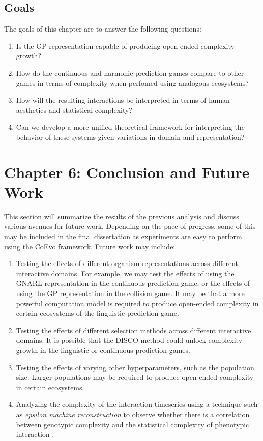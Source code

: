 \documentclass{article}
\begin{document}
\subsection*{Goals}
The goals of this chapter are to answer the following questions:
\begin{enumerate}
    \item Is the GP representation capable of producing open-ended complexity growth?
    \item How do the continuous and harmonic prediction games compare to other games in terms of 
        complexity when perfomed using analogous ecosystems?
    \item How will the resulting interactions be interpreted in terms of human aesthetics and
        statistical complexity?
    \item Can we develop a more unified theoretical framework for interpreting the behavior of these systems
        given variations in domain and representation?
\end{enumerate}

\section*{Chapter 6: Conclusion and Future Work}
This section will summarize the results of the previous analysis and discuss various
avenues for future work. Depending on the pace of progress, some of this may be included in the
final dissertation as experiments are easy to perform using the CoEvo framework. 
Future work may include:
\begin{enumerate}
    \item Testing the effects of different organism representations across different interactive
        domains. For example, we may test the effects of using the GNARL representation in the
        continuous prediction game, or the effects of using the GP representation in the collision
        game. It may be that a more powerful computation model is required to produce open-ended
        complexity in certain ecosystems of the linguistic prediction game.
    \item Testing the effects of different selection methods across different interactive domains.
        It is possible that the DISCO method could unlock complexity growth in the linguistic 
        or continuous prediction games.
    \item Testing the effects of varying other hyperparameters, such as the population size.   
        Larger populations may be required to produce open-ended complexity in certain ecosystems.
    \item Analyzing the complexity of the interaction timeseries using a technique such as 
        \textit{epsilon machine reconstruction} to observe whether there is a correlation 
        between genotypic complexity and the statistical complexity of phenotypic interaction 
        \citep{crutchfield2012between,bartlett2022}.
\end{enumerate}
\end{document}
